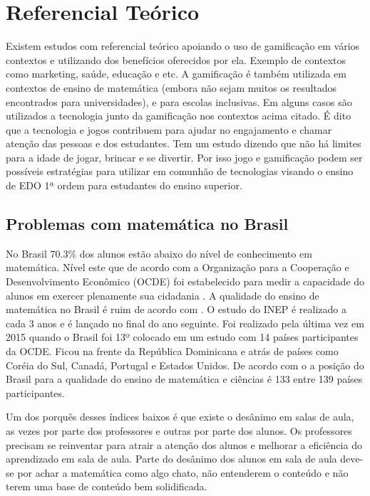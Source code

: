 \chapter[Referencial Teórico]{Referencial Teórico}
Existem estudos com referencial teórico apoiando o uso de gamificação em vários contextos e utilizando dos benefícios oferecidos por ela. Exemplo de contextos como marketing, saúde, educação e etc. A gamificação é também utilizada em contextos de ensino de matemática (embora não sejam muitos os resultados encontrados para universidades), e para escolas inclusivas. Em alguns casos são utilizados a tecnologia junto da gamificação nos contextos acima citado. É dito que a tecnologia e jogos contribuem para ajudar no engajamento e chamar atenção das pessoas e dos estudantes.
Tem um estudo dizendo que não há limites para a idade de jogar, brincar e se divertir. Por isso jogo e gamificação podem ser possíveis estratégias para utilizar em comunhão de tecnologias visando o ensino de EDO 1ª ordem para estudantes do ensino superior.

\section[Problemas com matemática no Brasil]{Problemas com matemática no Brasil}
No Brasil 70.3\% dos alunos estão abaixo do nível de conhecimento em matemática. Nível este que de acordo com a Organização para a Cooperação e Desenvolvimento Econômico (OCDE) foi estabelecido para medir a capacidade do alunos em exercer plenamente sua cidadania \cite{inep2015nivelcidadania}. A qualidade do ensino de matemática no Brasil é ruim de acordo com \cite{indiceRuimMat} \cite{inep2015}. O estudo do INEP é realizado a cada 3 anos e é lançado no final do ano seguinte. Foi realizado pela última vez em 2015 quando o Brasil foi 13º colocado em um estudo com 14 países participantes da OCDE. Ficou na frente da República Dominicana e atrás de países como Coréia do Sul, Canadá, Portugal e Estados Unidos. De acordo com o \cite{indiceRuimMat} a posição do Brasil para a qualidade do ensino de matemática e ciências é 133 entre 139 países participantes.

Um dos porquês desses índices baixos é que existe o desânimo em salas de aula, as vezes por parte dos professores e outras por parte dos alunos. Os professores precisam se reinventar para atrair a atenção dos alunos e melhorar a eficiência do aprendizado em sala de aula. Parte do desânimo dos alunos em sala de aula deve-se por achar a matemática como algo chato, não entenderem o conteúdo e não terem uma base de conteúdo bem solidificada.

